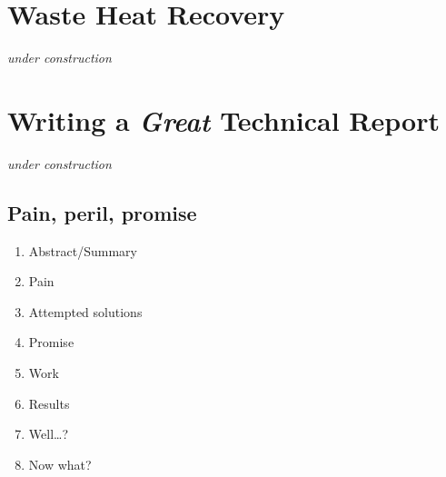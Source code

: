 \documentclass[
]{book}
\providecommand{\tightlist}{%
  \setlength{\itemsep}{0pt}\setlength{\parskip}{0pt}}
\begin{document}
\hypertarget{waste-heat-recovery}{%
\chapter{Waste Heat Recovery}\label{waste-heat-recovery}}

\emph{under construction}

\hypertarget{writing-a-great-technical-report}{%
\chapter{\texorpdfstring{Writing a \textbf{\emph{Great}} Technical Report}{Writing a Great Technical Report}}\label{writing-a-great-technical-report}}

\emph{under construction}

\hypertarget{pain-peril-promise}{%
\section{Pain, peril, promise}\label{pain-peril-promise}}

\begin{enumerate}
\def\labelenumi{\arabic{enumi}.}
\tightlist
\item
  Abstract/Summary
\item
  Pain
\item
  Attempted solutions
\item
  Promise
\item
  Work
\item
  Results
\item
  Well\ldots?
\item
  Now what?
\end{enumerate}

  
\end{document}
